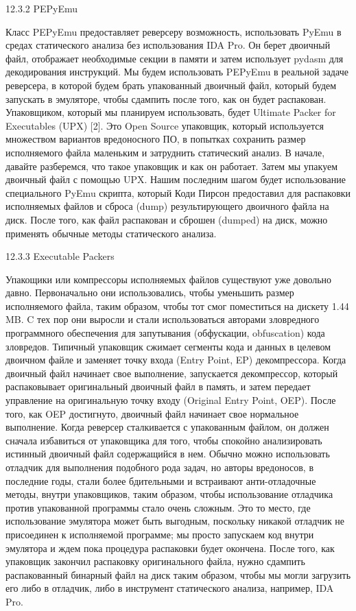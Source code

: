 \documentclass[12pt, a4paper, oneside]{book}
\begin{document}
12.3.2 PEPyEmu

Класс PEPyEmu предоставляет реверсеру возможность, использовать PyEmu в средах статического анализа без использования IDA Pro. Он берет двоичный файл, отображает необходимые секции в памяти и затем использует pydasm для декодирования инструкций. Мы будем использовать PEPyEmu в реальной задаче реверсера, в которой будем брать упакованный двоичный файл, который будем запускать в эмуляторе, чтобы сдампить после того, как он будет распакован. Упаковщиком, который мы планируем использовать, будет Ultimate Packer for Executables (UPX) [2]. Это Open Source упаковщик, который используется множеством вариантов вредоносного ПО, в попытках сохранить размер исполняемого файла маленьким и затруднить статический анализ. В начале, давайте разберемся, что такое упаковщик и как он работает. Затем мы упакуем двоичный файл с помощью UPX. Нашим последним шагом будет использование специального PyEmu скрипта, который Коди Пирсон предоставил для распаковки исполняемых файлов и сброса (dump) результирующего двоичного файла на диск. После того, как файл распакован и сброшен (dumped) на диск, можно применять обычные методы статического анализа.

12.3.3 Executable Packers

Упакощики или компрессоры исполняемых файлов существуют уже довольно давно. Первоначально они использовались, чтобы уменьшить размер исполняемого файла, таким образом, чтобы тот смог поместиться на дискету 1.44 MB. C тех пор они выросли и стали использоваться авторами зловредного программного обеспечения для запутывания (обфускации, obfuscation) кода зловредов. Типичный упаковщик сжимает сегменты кода и данных в целевом двоичном файле и заменяет точку входа (Entry Point, EP) декомпрессора. Когда двоичный файл начинает свое выполнение, запускается декомпрессор, который распаковывает оригинальный двоичный файл в память, и затем передает управление на оригинальную точку входу (Original Entry Point, OEP). После того, как OEP достигнуто, двоичный файл начинает свое нормальное выполнение. Когда реверсер сталкивается с упакованным файлом, он должен сначала избавиться от упаковщика для того, чтобы спокойно анализировать истинный двоичный файл содержащийся в нем. Обычно можно использовать отладчик для выполнения подобного рода задач, но авторы вредоносов, в последние годы, стали более бдительными и встраивают анти-отладочные методы, внутри упаковщиков, таким образом, чтобы использование отладчика против упакованной программы стало очень сложным. Это то место, где использование эмулятора может быть выгодным, поскольку никакой отладчик не присоединен к исполняемой программе; мы просто запускаем код внутри эмулятора и ждем пока процедура распаковки будет окончена. После того, как упаковщик закончил распаковку оригинального файла, нужно сдампить распакованный бинарный файл на диск таким образом, чтобы мы могли загрузить его либо в отладчик, либо в инструмент статического анализа, например, IDA Pro.
\end{document}
